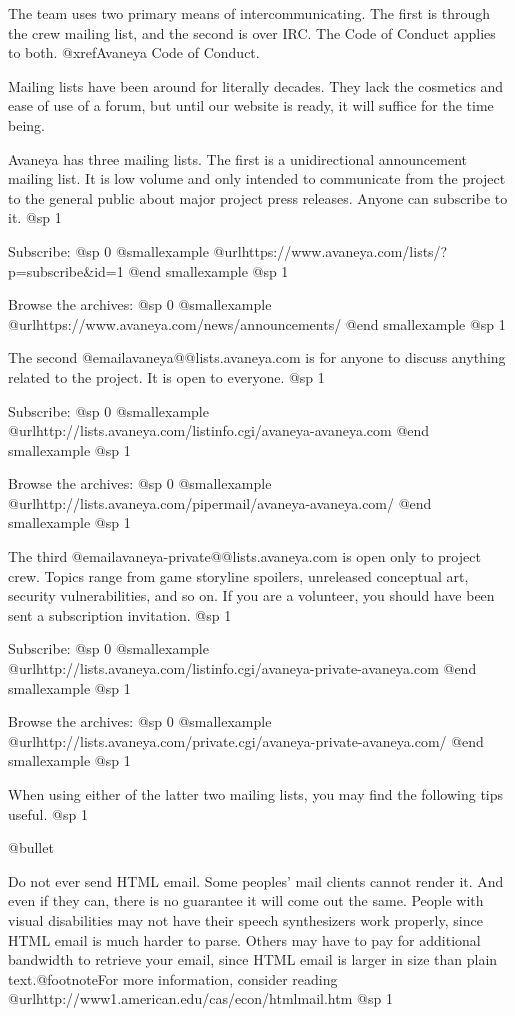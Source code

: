 The team uses two primary means of intercommunicating. The first is through the crew mailing list, and the second is over IRC. The Code of Conduct applies to both. @xref{Avaneya Code of Conduct}.

Mailing lists have been around for literally decades. They lack the cosmetics and ease of use of a forum, but until our website is ready, it will suffice for the time being.

Avaneya has three mailing lists. The first is a unidirectional announcement mailing list. It is low volume and only intended to communicate from the project to the general public about major project press releases. Anyone can subscribe to it.
@sp 1

Subscribe:
@sp 0
@smallexample
@url{https://www.avaneya.com/lists/?p=subscribe&id=1} 
@end smallexample
@sp 1

Browse the archives:
@sp 0
@smallexample
@url{https://www.avaneya.com/news/announcements/}
@end smallexample
@sp 1

The second @email{avaneya@@lists.avaneya.com} is for anyone to discuss anything related to the project. It is open to everyone.
@sp 1

Subscribe:
@sp 0
@smallexample
@url{http://lists.avaneya.com/listinfo.cgi/avaneya-avaneya.com} 
@end smallexample
@sp 1

Browse the archives:
@sp 0
@smallexample
@url{http://lists.avaneya.com/pipermail/avaneya-avaneya.com/}
@end smallexample
@sp 1

The third @email{avaneya-private@@lists.avaneya.com} is open only to project crew. Topics range from game storyline spoilers, unreleased conceptual art, security vulnerabilities, and so on. If you are a volunteer, you should have been sent a subscription invitation.
@sp 1

Subscribe:
@sp 0
@smallexample
@url{http://lists.avaneya.com/listinfo.cgi/avaneya-private-avaneya.com} 
@end smallexample
@sp 1

Browse the archives:
@sp 0
@smallexample
@url{http://lists.avaneya.com/private.cgi/avaneya-private-avaneya.com/}
@end smallexample
@sp 1

When using either of the latter two mailing lists, you may find the following tips useful.
@sp 1

\itemize @bullet
\item
Do not ever send HTML email. Some peoples' mail clients cannot render it. And even if they can, there is no guarantee it will come out the same. People with visual disabilities may not have their speech synthesizers work properly, since HTML email is much harder to parse. Others may have to pay for additional bandwidth to retrieve your email, since HTML email is larger in size than plain text.@footnote{For more information, consider reading @url{http://www1.american.edu/cas/econ/htmlmail.htm}}
@sp 1

